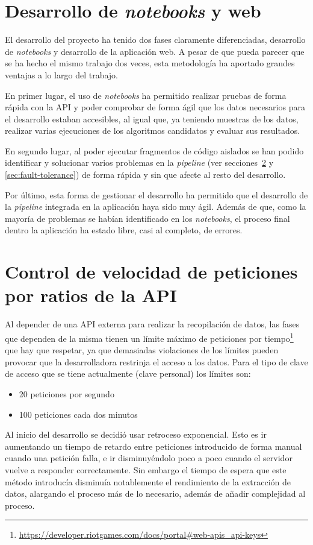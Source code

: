 \section{Desarrollo de \textit{notebooks} y web}
El desarrollo del proyecto ha tenido dos fases claramente diferenciadas, desarrollo de \textit{notebooks} y desarrollo de la aplicación web. A pesar de que pueda parecer que se ha hecho el mismo trabajo dos veces, esta metodología ha aportado grandes ventajas a lo largo del trabajo.

En primer lugar, el uso de \textit{notebooks} ha permitido realizar pruebas de forma rápida con la API y poder comprobar de forma ágil que los datos necesarios para el desarrollo estaban accesibles, al igual que, ya teniendo muestras de los datos, realizar varias ejecuciones de los algoritmos candidatos y evaluar sus resultados.

En segundo lugar, al poder ejecutar fragmentos de código aislados se han podido identificar y solucionar varios problemas en la \textit{pipeline} (ver secciones~\ref{sec:rate-limit} y \ref{sec:fault-tolerance}) de forma rápida y sin que afecte al resto del desarrollo.

Por último, esta forma de gestionar el desarrollo ha permitido que el desarrollo de la \textit{pipeline} integrada en la aplicación haya sido muy ágil. Además de que, como la mayoría de problemas se habían identificado en los \textit{notebooks}, el proceso final dentro la aplicación ha estado libre, casi al completo, de errores.

\section{Control de velocidad de peticiones por ratios de la API}\label{sec:rate-limit}
Al depender de una API externa para realizar la recopilación de datos, las fases que dependen de la misma tienen un límite máximo de peticiones por tiempo\footnote{\url{https://developer.riotgames.com/docs/portal\#web-apis_api-keys}} que hay que respetar, ya que demasiadas violaciones de los límites pueden provocar que la desarrolladora restrinja el acceso a los datos. Para el tipo de clave de acceso que se tiene actualmente (clave personal) los límites son:
\begin{itemize}
	\tightlist
	\item 20 peticiones por segundo
	\item 100 peticiones cada dos minutos
\end{itemize}
Al inicio del desarrollo se decidió usar retroceso exponencial. Esto es ir aumentando un tiempo de retardo entre peticiones introducido de forma manual cuando una petición falla, e ir disminuyéndolo poco a poco cuando el servidor vuelve a responder correctamente. Sin embargo el tiempo de espera que este método introducía disminuía notablemente el rendimiento de la extracción de datos, alargando el proceso más de lo necesario, además de añadir complejidad al proceso.

